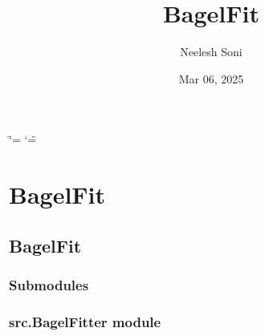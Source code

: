\documentclass[letterpaper,10pt,english]{sphinxmanual}
\title{BagelFit}
\date{Mar 06, 2025}
\author{Neelesh Soni}
\begin{document}
\ifdefined\shorthandoff
  \ifnum\catcode`\=\string=\active\shorthandoff{=}\fi
  \ifnum\catcode`\"=\active{}\fi
\fi

\pagestyle{empty}
\sphinxmaketitle
\pagestyle{plain}
\sphinxtableofcontents
\pagestyle{normal}
\label{\detokenize{index::doc}}


\sphinxstepscope


\chapter{BagelFit}
\label{\detokenize{modules:bagelfit}}\label{\detokenize{modules::doc}}
\sphinxstepscope


\section{BagelFit}
\label{\detokenize{src:bagelfit}}\label{\detokenize{src::doc}}

\subsection{Submodules}
\label{\detokenize{src:submodules}}

\subsection{src.BagelFitter module}
\label{\detokenize{src:module-src.BagelFitter}}\label{\detokenize{src:src-bagelfitter-module}}
\end{document}
